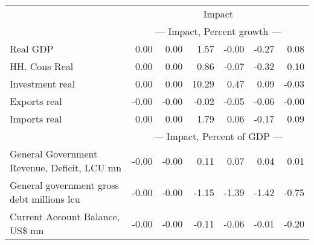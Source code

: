 \documentclass{article}
\begin{document}
\begin{table}[ht]
\begin{tabular}{lrrrrr|r}
&\multicolumn{6}{c}{{Impact}}                               \\
&\multicolumn{6}{c}{{--- Impact, Percent growth ---}}                               \\
Real GDP & 0.00 & 0.00 & 1.57 & -0.00 & -0.27 & 0.08 \\
HH. Cons Real & 0.00 & 0.00 & 0.86 & -0.07 & -0.32 & 0.10 \\
Investment real & 0.00 & 0.00 & 10.29 & 0.47 & 0.09 & -0.03 \\
Exports real & -0.00 & -0.00 & -0.02 & -0.05 & -0.06 & -0.00 \\
Imports real & 0.00 & 0.00 & 1.79 & 0.06 & -0.17 & 0.09 \\
&\multicolumn{6}{c}{{--- Impact, Percent of GDP ---}}                               \\
General Government Revenue, Deficit, LCU mn & -0.00 & -0.00 & 0.11 & 0.07 & 0.04 & 0.01 \\
General government gross debt millions lcu & -0.00 & -0.00 & -1.15 & -1.39 & -1.42 & -0.75 \\
Current Account Balance, US\$ mn & -0.00 & -0.00 & -0.11 & -0.06 & -0.01 & -0.20 \\
\bottomrule
\end{tabular}
\end{table}
\end{document}
